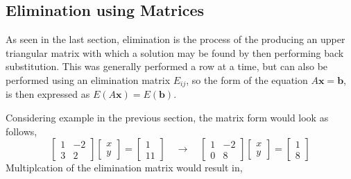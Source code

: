     \subsection{Elimination using Matrices}
        As seen in the last section, elimination is the process of the producing an upper triangular matrix with which
        a solution may be found by then performing back substitution. This was generally performed a row at a time, but
        can also be performed using an elimination matrix \(E_{ij}\), so the form of the equation
        \(A\boldsymbol{x} = \boldsymbol{b}\), is then expressed as \(E(A\boldsymbol{x}) = E(\boldsymbol{b})\).
        \par \hfill \break
        Considering example in the previous section, the matrix form would look as follows,
        \begin{equation}
            \begin{bmatrix}
                1 & -2 \\
                3 & 2
            \end{bmatrix}
            \begin{bmatrix}
                x \\
                y
            \end{bmatrix}
            =
            \begin{bmatrix}
                1 \\
                11
            \end{bmatrix}
            \quad \rightarrow \quad
            \begin{bmatrix}
                1 & -2 \\
                0 & 8
            \end{bmatrix}
            \begin{bmatrix}
                x \\
                y
            \end{bmatrix}
            =
            \begin{bmatrix}
                1 \\
                8
            \end{bmatrix}
        \end{equation}
        Multiplcation of the elimination matrix would result in,
